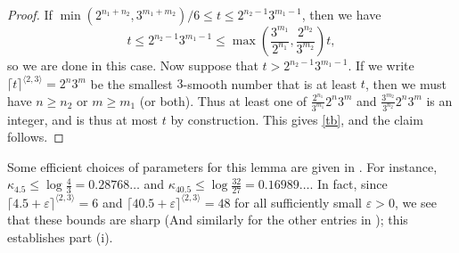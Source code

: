 \documentclass[12pt,a4paper,reqno]{amsart}
\numberwithin{equation}{section}
\theoremstyle{plain}
\theoremstyle{definition}
\newcommand\eps{\varepsilon}
\begin{document}
\begin{proof}  If $\min( 2^{n_1+n_2},3^{m_1+m_2})/6 \leq t \leq 2^{n_2-1} 3^{m_1-1}$, then we have
\begin{equation}\label{tb} 
  t \leq 2^{n_2-1} 3^{m_1-1} \leq \max\left(\frac{3^{m_1}}{2^{n_1}}, \frac{2^{n_2}}{3^{m_2}}\right) t,
\end{equation}
so we are done in this case.  Now suppose that $t > 2^{n_2-1} 3^{m_1-1}$.
If we write $\lceil t \rceil^{\langle 2,3 \rangle} =2^n 3^m$ be the smallest $3$-smooth number that is at least $t$, then we must have $n \geq n_2$ or $m \geq m_1$ (or both).  Thus at least one of $\frac{2^{n_1}}{3^{m_1}} 2^n 3^m$ and $\frac{3^{m_2}}{3^{n_2}} 2^n 3^m$ is an integer, and is thus at most $t$ by construction.  This gives \eqref{tb}, and the claim follows.
\end{proof}

Some efficient choices of parameters for this lemma are given in .  For instance, $\kappa_{4.5} \leq \log\frac{4}{3} = 0.28768\dots$ and $\kappa_{40.5} \leq \log \frac{32}{27} = 0.16989\dots$.  In fact, since $\lceil 4.5+\eps \rceil^{\langle 2,3\rangle} = 6$ and $\lceil 40.5+\eps \rceil^{\langle 2,3\rangle} = 48$ for all sufficiently small $\eps>0$, we see that these bounds are sharp (And similarly for the other entries in ); this establishes part (i).
\end{document}
